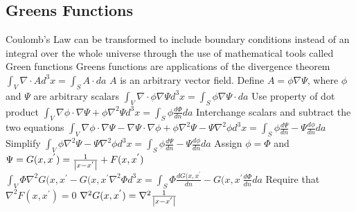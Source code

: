 \documentclass[12pt]{article}
\begin{document}
\subsection{Greens Functions}
Coulomb's Law can be transformed to include boundary conditions instead of an integral over the whole universe through the use of mathematical tools called Green functions
\newline Greens functions are applications of the divergence theorem
\newline $\int_V \nabla \cdot A d^3x = \int_S A \cdot da$
\newline $A$ is an arbitrary vector field. Define $A = \phi \nabla \Psi$, where $\phi$ and $\Psi$ are arbitrary scalars
\newline $\int_V \nabla \cdot \phi \nabla \Psi d^3x = \int_S \phi \nabla \Psi \cdot da$
\newline Use property of dot product
\newline $\int_V \nabla \phi \cdot \nabla \Psi + \phi \nabla^2 \Psi d^3x = \int_S \phi \frac{d\Phi}{dn} da$
\newline Interchange scalars and subtract the two equations
\newline $\int_V \nabla \phi \cdot \nabla \Psi - \nabla \Psi \cdot \nabla \phi + \phi \nabla^2 \Psi - \Psi \nabla^2 \phi d^3x = \int_S \phi \frac{d\Psi}{dn} - \Psi \frac{d\phi}{dn} da$
\newline Simplify
\newline $\int_V \phi \nabla^2 \Psi - \Psi \nabla^2 \phi d^3x = \int_S \phi \frac{d\Psi}{dn} - \Psi \frac{d\phi}{dn} da$
\newline Assign $\phi = \Phi$ and $\Psi = G(x,x^{'}) = \frac{1}{\abs{x-x^{'}}}+F(x,x^{'})$
\newline $\int_V \Phi \nabla^2 G(x,x^{'} - G(x,x^{'} \nabla^2 \Phi d^3x = \int_S \Phi \frac{dG(x,x^{'}}{dn} - G(x,x^{'} \frac{d\Phi}{dn} da$
\newline Require that $\nabla^2 F(x,x^{'}) = 0$
\newline $\nabla^2 G(x,x^{'}) = \nabla^2 \frac{1}{\abs{x-x^{'}}}$
\end{document}
